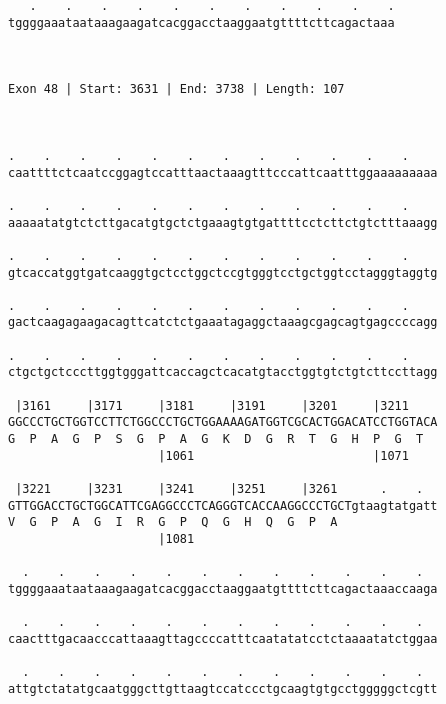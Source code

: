 \documentclass{article}
\begin{document}
\begin{Verbatim}
   .    .    .    .    .    .    .    .    .    .    .
tggggaaataataaagaagatcacggacctaaggaatgttttcttcagactaaa
                                                      
                                                      
 
Exon 48 | Start: 3631 | End: 3738 | Length: 107



.    .    .    .    .    .    .    .    .    .    .    .    
caattttctcaatccggagtccatttaactaaagtttcccattcaatttggaaaaaaaaa
                                                            
.    .    .    .    .    .    .    .    .    .    .    .    
aaaaatatgtctcttgacatgtgctctgaaagtgtgattttcctcttctgtctttaaagg
                                                            
.    .    .    .    .    .    .    .    .    .    .    .    
gtcaccatggtgatcaaggtgctcctggctccgtgggtcctgctggtcctagggtaggtg
                                                            
.    .    .    .    .    .    .    .    .    .    .    .    
gactcaagagaagacagttcatctctgaaatagaggctaaagcgagcagtgagccccagg
                                                            
.    .    .    .    .    .    .    .    .    .    .    .    
ctgctgctcccttggtgggattcaccagctcacatgtacctggtgtctgtcttccttagg
                                                            
 |3161     |3171     |3181     |3191     |3201     |3211    
GGCCCTGCTGGTCCTTCTGGCCCTGCTGGAAAAGATGGTCGCACTGGACATCCTGGTACA
G  P  A  G  P  S  G  P  A  G  K  D  G  R  T  G  H  P  G  T  
                     |1061                         |1071    
  
 |3221     |3231     |3241     |3251     |3261      .    .  
GTTGGACCTGCTGGCATTCGAGGCCCTCAGGGTCACCAAGGCCCTGCTgtaagtatgatt
V  G  P  A  G  I  R  G  P  Q  G  H  Q  G  P  A              
                     |1081                                  
  
  .    .    .    .    .    .    .    .    .    .    .    .  
tggggaaataataaagaagatcacggacctaaggaatgttttcttcagactaaaccaaga
                                                            
  .    .    .    .    .    .    .    .    .    .    .    .  
caactttgacaacccattaaagttagccccatttcaatatatcctctaaaatatctggaa
                                                            
  .    .    .    .    .    .    .    .    .    .    .    .  
attgtctatatgcaatgggcttgttaagtccatccctgcaagtgtgcctgggggctcgtt
                                                            

\end{Verbatim}
\end{document}
